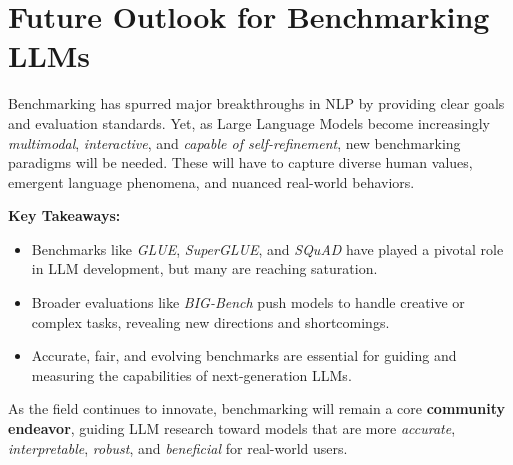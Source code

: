 \section{Future Outlook for Benchmarking LLMs}
\noindent
Benchmarking has spurred major breakthroughs in NLP by providing clear goals and evaluation standards. Yet, as Large Language Models become increasingly \emph{multimodal}, \emph{interactive}, and \emph{capable of self-refinement}, new benchmarking paradigms will be needed. These will have to capture diverse human values, emergent language phenomena, and nuanced real-world behaviors.

\noindent
\textbf{Key Takeaways:}
\begin{itemize}
    \item Benchmarks like \emph{GLUE}, \emph{SuperGLUE}, and \emph{SQuAD} have played a pivotal role in LLM development, but many are reaching saturation.
    \item Broader evaluations like \emph{BIG-Bench} push models to handle creative or complex tasks, revealing new directions and shortcomings.
    \item Accurate, fair, and evolving benchmarks are essential for guiding and measuring the capabilities of next-generation LLMs.  
\end{itemize}

\noindent
As the field continues to innovate, benchmarking will remain a core \textbf{community endeavor}, guiding LLM research toward models that are more \emph{accurate}, \emph{interpretable}, \emph{robust}, and \emph{beneficial} for real-world users.
